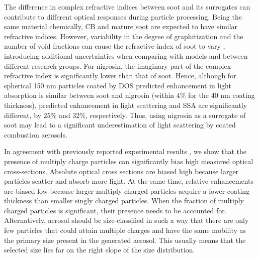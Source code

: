 The difference in complex refractive indices between soot and its surrogates can contribute to different optical responses during particle processing. Being the same material chemically, CB and mature soot are expected to have similar refractive indices. However, variability in the degree of graphitization and the number of void fractions can cause the refractive index of soot to vary \citep{RN72}, introducing additional uncertainties when comparing with models and between different research groups. For nigrosin, the imaginary part of the complex refractive index is significantly lower than that of soot. Hence, although for spherical 150 nm particles coated by DOS predicted enhancement in light absorption is similar between soot and nigrosin (within $4\%$ for the 40 nm coating thickness), predicted enhancement in light scattering and SSA are significantly different, by $25\%$ and $32\%$, respectively. Thus, using nigrosin as a surrogate of soot may lead to a significant underestimation of light scattering by coated combustion aerosols. 

In agreement with previously reported experimental results \citep{RN7,RN67}, we show that the presence of multiply charge particles can significantly bias high measured optical cross-sections. Absolute optical cross sections are biased high because larger particles scatter and absorb more light. At the same time, relative enhancements are biased low because larger multiply charged particles acquire a lower coating thickness than smaller singly charged particles. When the fraction of multiply charged particles is significant, their presence needs to be accounted for. Alternatively, aerosol should be size-classified in such a way that there are only few particles that could attain multiple charges and have the same mobility as the primary size present in the generated aerosol. This usually means that the selected size lies far on the right slope of the size distribution.


